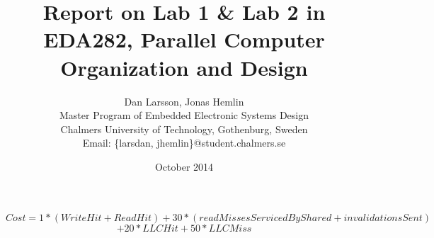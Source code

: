 \documentclass[a4paper]{article}
\title{Report on Lab 1 \& Lab 2 in EDA282, Parallel Computer Organization and Design}
\date{October 2014}
\author{Dan Larsson, Jonas Hemlin
\\Master Program of Embedded Electronic Systems Design\\
Chalmers University of Technology, Gothenburg, Sweden\\
Email: \{larsdan, jhemlin\}@student.chalmers.se}
\begin{document}
\maketitle
$$ Cost = 1 * (WriteHit+ReadHit) + 30 * (readMissesServicedByShared + invalidationsSent)$$ $$+ 20 * LLCHit + 50 * LLCMiss $$




\end{document}
